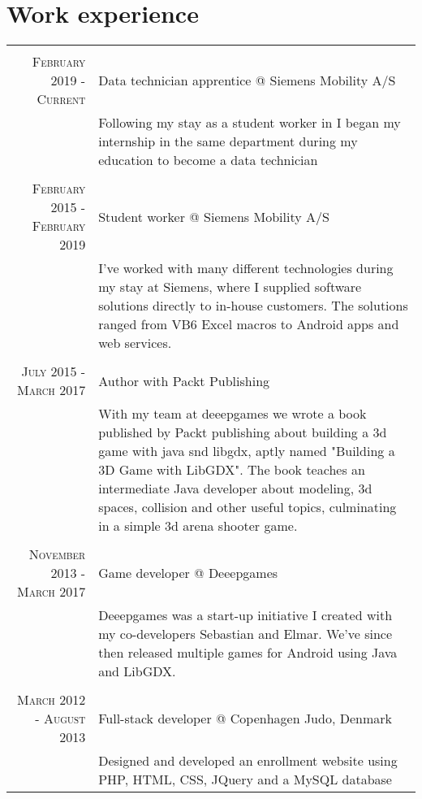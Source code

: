 \documentclass[a4paper,10pt]{article}
\begin{document}
\section{Work experience}
\begin{tabular}{r|p{11cm}}
    \multicolumn{2}{c}{} \\
    \textsc{February 2019 - Current} & Data technician apprentice @ Siemens Mobility A/S\\&\footnotesize{Following my stay as a student worker in I began my internship in the same department during my education to become a data technician}\\
    
    \multicolumn{2}{c}{} \\
    \textsc{February 2015 - February 2019} & Student worker @ Siemens Mobility A/S\\&\footnotesize{I’ve worked with many different technologies during my stay at Siemens, where I supplied software solutions directly to in-house customers. The solutions ranged from VB6 Excel macros to Android apps and web services.}\\
    
    \multicolumn{2}{c}{} \\
    \textsc{July 2015 - March 2017} & Author with Packt Publishing\\&\footnotesize{With my team at deeepgames we wrote a book published by Packt publishing about building a 3d game with java snd libgdx, aptly named "Building a 3D Game with LibGDX". The book teaches an intermediate Java developer about modeling, 3d spaces, collision and other useful topics, culminating in a simple 3d arena shooter game.}\\

    \multicolumn{2}{c}{} \\
    \textsc{November 2013 - March 2017} & Game developer @ Deeepgames\\&\footnotesize{Deeepgames was a start-up initiative I created with my co-developers Sebastian and Elmar. We've since then released multiple games for Android using Java and LibGDX.}\\

    \multicolumn{2}{c}{} \\
    \textsc{March 2012 - August 2013} & Full-stack developer @ Copenhagen Judo, Denmark \\&\footnotesize{Designed and developed an enrollment website using PHP, HTML, CSS, JQuery and a MySQL database}\\
    
\end{tabular}
\end{document}

